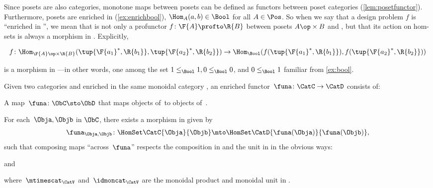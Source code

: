 Since posets are also categories, monotone maps between posets can be defined as functors between poset categories (\cref{lem:posetfunctor}). Furthermore, posets are enriched in \Bool (\cref{ex:enrichbool}), \ie  $\Hom_A(a,b) \in \Bool$ for all $A \in \Pos$. So when we say that a design problem $f$ is ``enriched in \Bool'', we mean that is not only a profunctor $f \colon \F{A} \profto \R{B}$ between posets $A\op \times B$ and \Bool, but that its action on hom-sets is always a morphism in \Bool. Explicitly,
\begin{widepar}
\begin{equation*}
  f \colon \Hom_{\F{A}\op \times \R{B}}(\tup{\F{a_1}^*,\R{b_1}}, \tup{\F{a_2}^*,\R{b_2}}) \to \Hom_\Bool(f(\tup{\F{a_1}^*,\R{b_1}}), f(\tup{\F{a_2}^*,\R{b_2}}))
\end{equation*}
\end{widepar}
is a morphism in \Bool---in other words, one among the set $1 \leq_\Bool 1, 0 \leq_\Bool 0$, and $0 \leq_\Bool 1$ familiar from \cref{ex:bool}.

\begin{ctdefinition}
  \label{def:enrichedfunctor}
  Given two categories \CatC and \CatD enriched in the same monoidal category \CatV, an enriched functor~$\funa\colon \CatC \to \CatD$ consists of:
  \begin{compactenum}
    \item A map~$\funa\colon \ObC \sto \ObD$ that maps objects of~\CatC to objects of~\CatD.
    \item For each~$\Obja, \Objb$ in $\ObC$, there exists a morphism in \CatV given by
    \begin{equation*}
      \funa_{\Obja, \Objb} \colon \HomSet\CatC{\Obja}{\Objb} \mto \HomSet\CatD{\funa(\Obja)}{\funa(\Objb)},
    \end{equation*}
    such that composing maps ``across~$\funa$'' respects the composition in \CatC and the unit in \CatV in the obvious ways:
    \begin{center}
    \end{center}
    and
    \begin{center}
    \end{center}
    where~$\mtimescat_{\CatV}$ and~$\idmoncat_{\CatV}$ are the monoidal product and monoidal unit in \CatV.
  \end{compactenum}
\end{ctdefinition}


